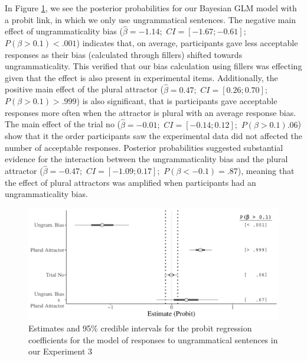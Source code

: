 In Figure \ref{fig:UngramaticalBayesianGLM}, we see the posterior probabilities for our Bayesian GLM model with a probit link, in which we only use ungrammatical sentences. The negative main effect of ungrammaticality bias ($\hat{\beta}=-1.14;$ $CI=[-1.67; -0.61];$ $P(\beta>0.1)< .001$) indicates that, on average, participants gave less acceptable responses as their bias (calculated through fillers) shifted towards ungrammaticality. This verified that our bias calculation using fillers was effecting given that the effect is also present in experimental items. Additionally, the positive main effect of the plural attractor ($\hat{\beta}=0.47;$ $CI=[0.26; 0.70];$ $P(\beta>0.1)> .999$) is also significant, that is participants gave acceptable responses more often when the attractor is plural with an average response bias. The main effect of the trial no ($\hat{\beta}=-0.01;$ $CI=[-0.14; 0.12];$ $P(\beta>0.1)   .06$) show that it the order participants saw the experimental data did not affected the number of acceptable responses. Posterior probabilities suggested substantial evidence for the interaction between the ungrammaticality bias and the plural attractor ($\hat{\beta}=-0.47;$ $CI=[-1.09; 0.17];$ $P(\beta< -0.1)=    .87$), meaning that the effect of plural attractors was amplified when participants had an ungrammaticality bias.


\begin{knitrout}
\color{fgcolor}\begin{figure}[hbt!]

{\centering \includegraphics[width=\linewidth]{figure/UngramaticalBayesianGLM-1} 

}

\caption{Estimates and 95\% credible intervals for the probit regression coefficients for the model of responses to ungrammatical sentences in our Experiment 3}\label{fig:UngramaticalBayesianGLM}
\end{figure}

\end{knitrout}


